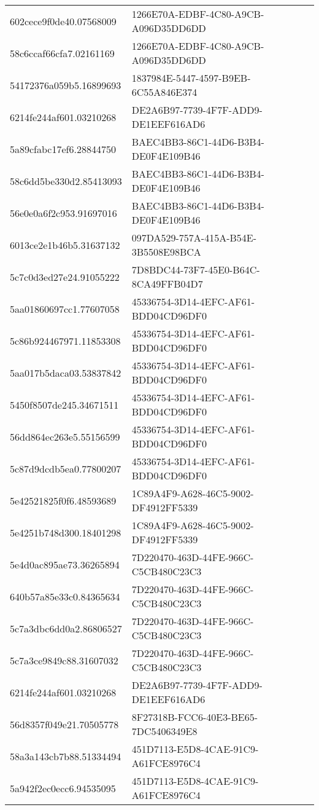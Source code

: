 \begin{tabular}{ll}
602cece9f0de40.07568009 & 1266E70A-EDBF-4C80-A9CB-A096D35DD6DD \\
58c6ccaf66cfa7.02161169 & 1266E70A-EDBF-4C80-A9CB-A096D35DD6DD \\
54172376a059b5.16899693 & 1837984E-5447-4597-B9EB-6C55A846E374 \\
6214fe244af601.03210268 & DE2A6B97-7739-4F7F-ADD9-DE1EEF616AD6 \\
5a89cfabc17ef6.28844750 & BAEC4BB3-86C1-44D6-B3B4-DE0F4E109B46 \\
58c6dd5be330d2.85413093 & BAEC4BB3-86C1-44D6-B3B4-DE0F4E109B46 \\
56e0e0a6f2c953.91697016 & BAEC4BB3-86C1-44D6-B3B4-DE0F4E109B46 \\
6013ce2e1b46b5.31637132 & 097DA529-757A-415A-B54E-3B5508E98BCA \\
5c7c0d3ed27e24.91055222 & 7D8BDC44-73F7-45E0-B64C-8CA49FFB04D7 \\
5aa01860697cc1.77607058 & 45336754-3D14-4EFC-AF61-BDD04CD96DF0 \\
5c86b924467971.11853308 & 45336754-3D14-4EFC-AF61-BDD04CD96DF0 \\
5aa017b5daca03.53837842 & 45336754-3D14-4EFC-AF61-BDD04CD96DF0 \\
5450f8507de245.34671511 & 45336754-3D14-4EFC-AF61-BDD04CD96DF0 \\
56dd864ec263e5.55156599 & 45336754-3D14-4EFC-AF61-BDD04CD96DF0 \\
5c87d9dcdb5ea0.77800207 & 45336754-3D14-4EFC-AF61-BDD04CD96DF0 \\
5e42521825f0f6.48593689 & 1C89A4F9-A628-46C5-9002-DF4912FF5339 \\
5e4251b748d300.18401298 & 1C89A4F9-A628-46C5-9002-DF4912FF5339 \\
5e4d0ac895ae73.36265894 & 7D220470-463D-44FE-966C-C5CB480C23C3 \\
640b57a85e33c0.84365634 & 7D220470-463D-44FE-966C-C5CB480C23C3 \\
5c7a3dbc6dd0a2.86806527 & 7D220470-463D-44FE-966C-C5CB480C23C3 \\
5c7a3ce9849c88.31607032 & 7D220470-463D-44FE-966C-C5CB480C23C3 \\
6214fe244af601.03210268 & DE2A6B97-7739-4F7F-ADD9-DE1EEF616AD6 \\
56d8357f049e21.70505778 & 8F27318B-FCC6-40E3-BE65-7DC5406349E8 \\
58a3a143cb7b88.51334494 & 451D7113-E5D8-4CAE-91C9-A61FCE8976C4 \\
5a942f2ec0ecc6.94535095 & 451D7113-E5D8-4CAE-91C9-A61FCE8976C4 \\

\end{tabular}
